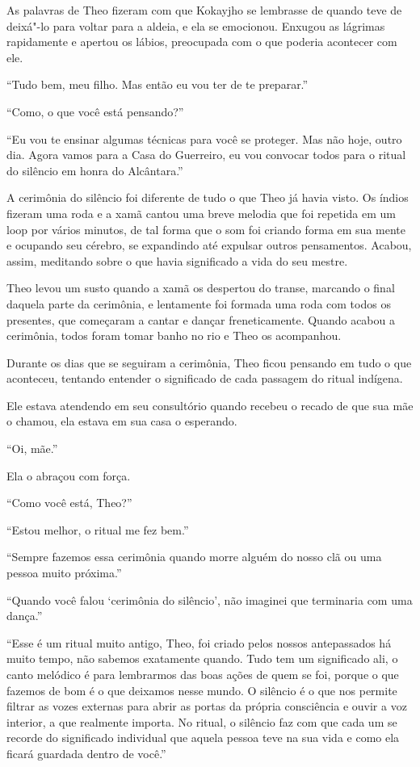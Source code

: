 As palavras de Theo fizeram com que Kokayjho se lembrasse de quando teve
de deixá"-lo para voltar para a aldeia, e ela se emocionou. Enxugou as
lágrimas rapidamente e apertou os lábios, preocupada com o que poderia
acontecer com ele.

``Tudo bem, meu filho. Mas então eu vou ter de te preparar.''

``Como, o que você está pensando?''

``Eu vou te ensinar algumas técnicas para você se proteger. Mas não
hoje, outro dia. Agora vamos para a Casa do Guerreiro, eu vou convocar
todos para o ritual do silêncio em honra do Alcântara.''

\asterisc


A cerimônia do silêncio foi diferente de tudo o que Theo já havia visto.
Os índios fizeram uma roda e a xamã cantou uma breve melodia que foi
repetida em um loop por vários minutos, de tal forma que o som foi
criando forma em sua mente e ocupando seu cérebro, se expandindo até
expulsar outros pensamentos. Acabou, assim, meditando sobre o que havia
significado a vida do seu mestre.

Theo levou um susto quando a xamã os despertou do transe, marcando o
final daquela parte da cerimônia, e lentamente foi formada uma roda com
todos os presentes, que começaram a cantar e dançar freneticamente.
Quando acabou a cerimônia, todos foram tomar banho no rio e Theo os
acompanhou.

Durante os dias que se seguiram a cerimônia, Theo ficou pensando em tudo
o que aconteceu, tentando entender o significado de cada passagem do
ritual indígena.

Ele estava atendendo em seu consultório quando recebeu o recado de que
sua mãe o chamou, ela estava em sua casa o esperando.

``Oi, mãe.''

Ela o abraçou com força.

``Como você está, Theo?''

``Estou melhor, o ritual me fez bem.''

``Sempre fazemos essa cerimônia quando morre alguém do nosso clã ou uma
pessoa muito próxima.''

``Quando você falou `cerimônia do silêncio', não imaginei que terminaria
com uma dança.''

``Esse é um ritual muito antigo, Theo, foi criado pelos nossos
antepassados há muito tempo, não sabemos exatamente quando. Tudo tem um
significado ali, o canto melódico é para lembrarmos das boas ações de
quem se foi, porque o que fazemos de bom é o que deixamos nesse mundo. O
silêncio é o que nos permite filtrar as vozes externas para abrir as
portas da própria consciência e ouvir a voz interior, a que realmente
importa. No ritual, o silêncio faz com que cada um se recorde do
significado individual que aquela pessoa teve na sua vida e como ela
ficará guardada dentro de você.''

